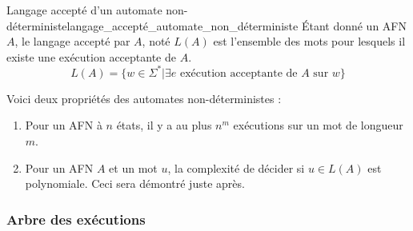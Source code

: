 \begin{definition}{Langage accepté d'un automate non-déterministe}{langage_accepté_automate_non_déterministe}
    Étant donné un AFN $A$, le langage accepté par $A$, noté $L(A)$ est l'ensemble des mots pour lesquels il existe une 
    exécution acceptante de $A$.
    \begin{equation*}
        L(A) = \{w \in \Sigma^* | \exists e \text{ exécution acceptante de } A \text{ sur } w\}
    \end{equation*}
\end{definition}
\begin{remark}
    Voici deux propriétés des automates non-déterministes :
    \begin{enumerate}
        \item Pour un AFN à $n$ états, il y a au plus $n^m$ exécutions sur un mot de longueur $m$.
        \item Pour un AFN $A$ et un mot $u$, la complexité de décider si $u \in L(A)$ est polynomiale. Ceci sera démontré
        juste après.
    \end{enumerate}
\end{remark}




\subsubsection{Arbre des exécutions}
\label{subsub:arbre_des_executions}

